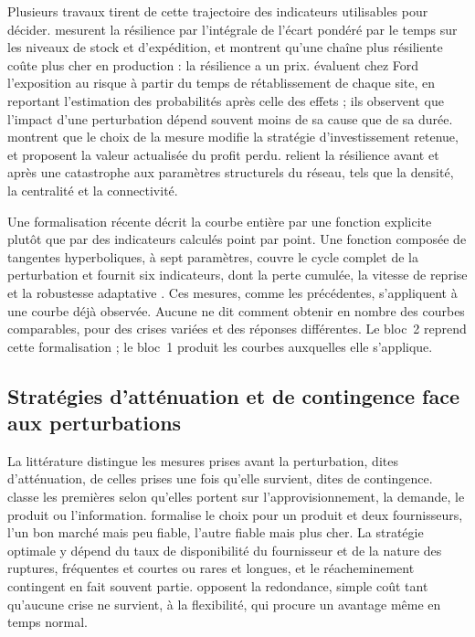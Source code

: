 Plusieurs travaux tirent de cette trajectoire des indicateurs utilisables pour décider. \citet{spiegler2012} mesurent la résilience par l'intégrale de l'écart pondéré par le temps sur les niveaux de stock et d'expédition, et montrent qu'une chaîne plus résiliente coûte plus cher en production : la résilience a un prix. \citet{simchilevi2015} évaluent chez Ford l'exposition au risque à partir du temps de rétablissement de chaque site, en reportant l'estimation des probabilités après celle des effets ; ils observent que l'impact d'une perturbation dépend souvent moins de sa cause que de sa durée. \citet{behzadi2020} montrent que le choix de la mesure modifie la stratégie d'investissement retenue, et proposent la valeur actualisée du profit perdu. \citet{dixit2020} relient la résilience avant et après une catastrophe aux paramètres structurels du réseau, tels que la densité, la centralité et la connectivité.

Une formalisation récente décrit la courbe entière par une fonction explicite plutôt que par des indicateurs calculés point par point. Une fonction composée de tangentes hyperboliques, à sept paramètres, couvre le cycle complet de la perturbation et fournit six indicateurs, dont la perte cumulée, la vitesse de reprise et la robustesse adaptative \citep{rahiel2026in4pl, rahiel2026these}. Ces mesures, comme les précédentes, s'appliquent à une courbe déjà observée. Aucune ne dit comment obtenir en nombre des courbes comparables, pour des crises variées et des réponses différentes. Le bloc~2 reprend cette formalisation ; le bloc~1 produit les courbes auxquelles elle s'applique.

\subsection{Stratégies d'atténuation et de contingence face aux perturbations}
\label{sec:ea-strategies}

La littérature distingue les mesures prises avant la perturbation, dites d'atténuation, de celles prises une fois qu'elle survient, dites de contingence. \citet{tang2006} classe les premières selon qu'elles portent sur l'approvisionnement, la demande, le produit ou l'information. \citet{tomlin2006} formalise le choix pour un produit et deux fournisseurs, l'un bon marché mais peu fiable, l'autre fiable mais plus cher. La stratégie optimale y dépend du taux de disponibilité du fournisseur et de la nature des ruptures, fréquentes et courtes ou rares et longues, et le réacheminement contingent en fait souvent partie. \citet{sheffirice2005} opposent la redondance, simple coût tant qu'aucune crise ne survient, à la flexibilité, qui procure un avantage même en temps normal.


